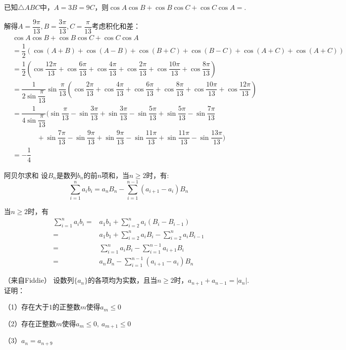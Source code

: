 \begin{example}{}{}
    已知$\triangle{ABC}$中，$A=3B=9C$，则$\cos A\cos B+\cos B\cos C+\cos C\cos A=$\underline{\hspace{1cm}}.
\end{example}
\begin{solution}
解得$A=\dfrac{9\pi}{13},B=\dfrac{3\pi}{13},C=\dfrac{\pi}{13}$考虑积化和差：
\begin{align*}
&\cos A\cos B+\cos B\cos C+\cos C\cos A\\
&=\dfrac12(\cos(A+B)+\cos(A-B)+\cos(B+C)+\cos(B-C)+\cos(A+C)+\cos(A+C))\\
&=\dfrac12(\cos\dfrac{12\pi}{13}+\cos\dfrac{6\pi}{13}+\cos\dfrac{4\pi}{13}+\cos\dfrac{2\pi}{13}+\cos\dfrac{10\pi}{13}+\cos\dfrac{8\pi}{13})\\
&=\dfrac{1}{2\sin\dfrac{\pi}{13}}\sin\dfrac{\pi}{13}(\cos\dfrac{2\pi}{13}+\cos\dfrac{4\pi}{13}+\cos\dfrac{6\pi}{13}+\cos\dfrac{8\pi}{13}+\cos\dfrac{10\pi}{13}+\cos\dfrac{12\pi}{13})\\
&=\dfrac{1}{4\sin\dfrac{\pi}{13}}(\sin\dfrac{\pi}{13}-\sin\dfrac{3\pi}{13}+\sin\dfrac{3\pi}{13}-\sin\dfrac{5\pi}{13}+\sin\dfrac{5\pi}{13}-\sin\dfrac{7\pi}{13}\\
&~~~~~~~~~~~~~~~~+\sin\dfrac{7\pi}{13}-\sin\dfrac{9\pi}{13}+\sin\dfrac{9\pi}{13}-\sin\dfrac{11\pi}{13}+\sin\dfrac{11\pi}{13}-\sin\dfrac{13\pi}{13})\\
&=-\dfrac14
\end{align*}
\end{solution}
\begin{theorem}{阿贝尔求和}{}
    设$B_n$是数列$b_n$的前$n$项和，当$n\ge 2$时，有:\vspace{-5pt}\[
    \sum_{i=1}^na_ib_i=a_nB_n-\sum_{i=1}^{n-1}(a_{i+1}-a_i)B_n\]
\end{theorem}
\begin{myproof}
    当$n\ge 2$时，有
    \begin{align*}
        \sum_{i=1}^na_ib_i=&a_1b_1+\sum_{i=2}^{n}a_i(B_i-B_{i-1})\\
        =&a_1b_1+\sum_{i=2}^{n}a_iB_i-\sum_{i=2}^{n}a_iB_{i-1}\\
        =&\sum_{i=1}^{n}a_iB_i-\sum_{i=1}^{n-1}a_{i+1}B_i\\
        =&a_nB_n-\sum_{i=1}^{n-1}(a_{i+1}-a_i)B_n
    \end{align*}
\end{myproof}
\begin{example}{（来自Fiddie）}{}
    设数列$\{a_n\}$的各项均为实数，且当$n\ge 2$时，$a_{n+1}+a_{n-1}=|a_n|$.证明：

    （1）存在大于$1$的正整数$m$使得$a_m\le 0$

    （2）存在正整数$m$使得$a_m\le 0,~a_{m+1}\le 0$

    （3）$a_n=a_{n+9}$ 
\end{example}
